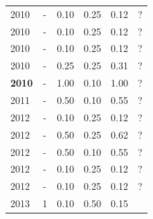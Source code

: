 \begin{table}[H]
\begin{tabular}{| l | c | c | c | c | c |}
          \\
\hline
            2010
          &
          -
          &
          0.10
          &
          0.25
          &
            {\color{red} 0.12}
          &
          ?
          \\
            2010
          &
          -
          &
          0.10
          &
          0.25
          &
            {\color{red} 0.12}
          &
          ?
          \\
            2010
          &
          -
          &
          0.10
          &
          0.25
          &
            {\color{red} 0.12}
          &
          ?
          \\
            2010
          &
          -
          &
          0.25
          &
          0.25
          &
            {\color{red} 0.31}
          &
          ?
          \\
            {\bf 2010}
          &
          -
          &
          1.00
          &
          0.10
          &
            {\color{blue} 1.00}
          &
          ?
          \\
\hline
            2011
          &
          -
          &
          0.50
          &
          0.10
          &
            {\color{blue} 0.55}
          &
          ?
          \\
\hline
            2012
          &
          -
          &
          0.10
          &
          0.25
          &
            {\color{red} 0.12}
          &
          ?
          \\
            2012
          &
          -
          &
          0.50
          &
          0.25
          &
            {\color{blue} 0.62}
          &
          ?
          \\
            2012
          &
          -
          &
          0.50
          &
          0.10
          &
            {\color{blue} 0.55}
          &
          ?
          \\
            2012
          &
          -
          &
          0.10
          &
          0.25
          &
            {\color{red} 0.12}
          &
          ?
          \\
            2012
          &
          -
          &
          0.10
          &
          0.25
          &
            {\color{red} 0.12}
          &
          ?
          \\
\hline
            2013
          &
          1
          &
          0.10
          &
          0.50
          &
            {\color{red} 0.15}
          &

\end{tabular}
\end{table}
